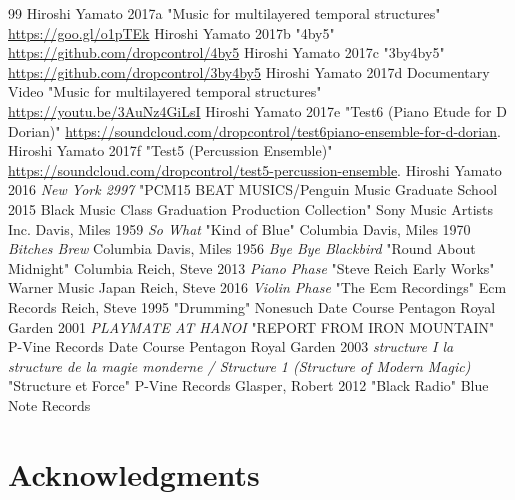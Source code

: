 \begin{referenceworks}{99}
 Hiroshi Yamato 2017a "Music for multilayered temporal structures" \url{https://goo.gl/o1pTEk}
 Hiroshi Yamato 2017b "4by5" \url{https://github.com/dropcontrol/4by5}
 Hiroshi Yamato 2017c "3by4by5" \url{https://github.com/dropcontrol/3by4by5}
 Hiroshi Yamato 2017d Documentary Video "Music for multilayered temporal structures" \url{https://youtu.be/3AuNz4GiLsI}
 Hiroshi Yamato 2017e "Test6 (Piano Etude for D Dorian)" \url{https://soundcloud.com/dropcontrol/test6piano-ensemble-for-d-dorian}.
 Hiroshi Yamato 2017f "Test5 (Percussion Ensemble)" \url{https://soundcloud.com/dropcontrol/test5-percussion-ensemble}.
 Hiroshi Yamato 2016 {\it New York 2997} "PCM15 BEAT MUSICS/Penguin Music Graduate School 2015 Black Music Class Graduation Production Collection" Sony Music Artists Inc.
 Davis, Miles 1959 {\it So What} "Kind of Blue" Columbia
 Davis, Miles 1970 {\it Bitches Brew} Columbia
 Davis, Miles 1956 {\it Bye Bye Blackbird} "Round About Midnight" Columbia
 Reich, Steve 2013 {\it Piano Phase} "Steve Reich Early Works" Warner Music Japan
 Reich, Steve 2016 {\it Violin Phase} "The Ecm Recordings" Ecm Records
 Reich, Steve 1995 "Drumming" Nonesuch
 Date Course Pentagon Royal Garden 2001 {\it PLAYMATE AT HANOI} "REPORT FROM IRON MOUNTAIN" P-Vine Records
 Date Course Pentagon Royal Garden 2003 {\it structure I la structure de la magie monderne / Structure 1 (Structure of Modern Magic)} "Structure et Force" P-Vine Records
 Glasper, Robert 2012 "Black Radio" Blue Note Records
\end{referenceworks}

\afterpage{\clearpage}
\newpage

\section*{Acknowledgments}

